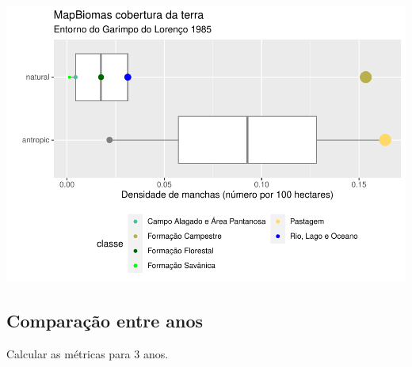 \documentclass[
]{article}
\begin{document}
\includegraphics{epr_files/figure-latex/unnamed-chunk-72-1.pdf}

\hypertarget{comparauxe7uxe3o-entre-anos}{%
\subsection{Comparação entre anos}\label{comparauxe7uxe3o-entre-anos}}

Calcular as métricas para 3 anos.
\end{document}
